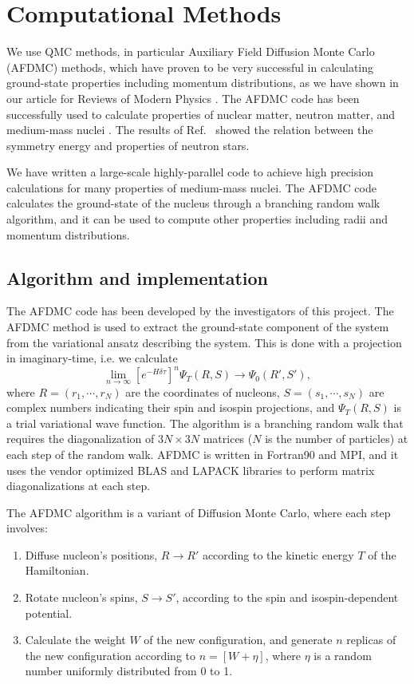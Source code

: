 \documentclass[12pt,letterpaper]{article}
\begin{document}
\section{Computational Methods}
\label{sec:comp_met}

We use QMC methods, in particular Auxiliary Field Diffusion Monte Carlo 
(AFDMC) methods, which have proven to be very successful in calculating 
ground-state properties including momentum distributions, as we have shown 
in our article for Reviews of Modern Physics \cite{car15}. The AFDMC code 
has been successfully used to calculate properties of nuclear matter, 
neutron matter, and medium-mass nuclei \cite{gan14}. The results of 
Ref.~\cite{gan12} showed the relation between the symmetry energy and 
properties 
of neutron stars.

We have written a large-scale highly-parallel code to achieve high precision 
calculations for many properties of medium-mass nuclei. The AFDMC code 
calculates the
ground-state of the nucleus through a branching random walk algorithm, and it
can be used to compute other properties including radii and momentum 
distributions.

\subsection{Algorithm and implementation}

The AFDMC code has been developed by the investigators of this project. The 
AFDMC method is used to extract the ground-state component of the system 
from the variational ansatz describing the system. This is done with a 
projection in imaginary-time, i.e. we calculate
\begin{equation}
\label{eq:dif}
\lim_{n\rightarrow\infty}\left[ e^{-H\delta\tau}\right]^n \Psi_T(R,S) 
\rightarrow \Psi_0(R',S'),
\end{equation}
where $R =(r_1, \cdots, r_N)$ are the coordinates of nucleons, $S = (s_1, 
\cdots, s_N)$ are complex numbers indicating their spin and isospin 
projections, and $\Psi_T(R,S)$ is a trial variational wave function. The 
algorithm is a branching random walk that requires the diagonalization of 
$3N \times 3N$ matrices ($N$ is the number of particles) at each step of the 
random walk. AFDMC is written in Fortran90 and MPI, and it uses the vendor 
optimized BLAS and LAPACK libraries to perform matrix diagonalizations at 
each step.

The AFDMC algorithm is a variant of Diffusion Monte Carlo, where each step 
involves:
\begin{enumerate}
\item Diffuse nucleon’s positions, $R \rightarrow R'$ according to the 
kinetic energy $T$ of the Hamiltonian.
\item Rotate nucleon’s spins, $S \rightarrow S'$, according to the spin and 
isospin-dependent potential.
\item Calculate the weight $W$ of the new configuration, and generate $n$ 
replicas of the new configuration according to $n = [W + \eta]$, where 
$\eta$  is a random number uniformly distributed from 0 to 1.
\end{enumerate}
\end{document}
